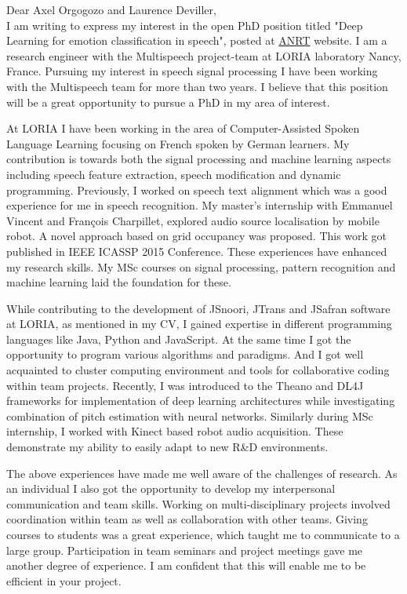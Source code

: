 \documentclass[10pt,a4paper]{letter}
\begin{document}
Dear Axel Orgogozo and Laurence Deviller,\\

		I am writing to express my interest in the open PhD position titled "Deep Learning for emotion classification in speech", posted at \href{http://www.anrt.asso.fr/com/imgAdmin/1459332134891.pdf}{ANRT} website. I am a research engineer with the Multispeech project-team at LORIA laboratory Nancy, France. Pursuing my interest in speech signal processing I have been working with the Multispeech team for more than two years. I believe that this position will be a great opportunity to pursue a PhD in my area of interest. 
		
		At LORIA I have been working in the area of Computer-Assisted Spoken Language Learning focusing on French spoken by German learners. My contribution is towards both the signal processing and machine learning aspects including speech feature extraction, speech modification and dynamic programming. Previously, I worked on speech text alignment which was a good experience for me in speech recognition. My master's internship with Emmanuel Vincent and François Charpillet, explored audio source localisation by mobile robot. A novel approach based on grid occupancy was proposed. This work got published in IEEE ICASSP 2015 Conference. These experiences have enhanced my research skills. My MSc courses on signal processing, pattern recognition and machine learning laid the foundation for these.   

		
		While contributing to the development of JSnoori, JTrans and J\-Safran software at LORIA, as mentioned in my CV, I gained expertise in different programming languages like Java, Python and JavaScript. At the same time I got the opportunity to program various algorithms and paradigms. And I got well acquainted 	to cluster computing environment	and tools for collaborative coding within team projects. Recently, I was introduced to the Theano and DL4J frameworks for implementation of deep learning architectures while investigating combination of pitch estimation with  neural networks. Similarly during MSc internship, I worked with Kinect based robot audio acquisition. These demonstrate my ability to easily adapt to new R\&D environments.    
		
		The above experiences have made me well aware of the challenges of research. As an individual I also got the opportunity to develop my interpersonal communication and team 		
skills. Working on multi-disciplinary projects involved coordination within  team as well as collaboration with other teams. Giving courses to students was a great experience, which taught me to communicate to a large group. Participation in team seminars and project meetings gave me another degree of experience. I am confident that this will enable me to be efficient in your project.
\end{document}
